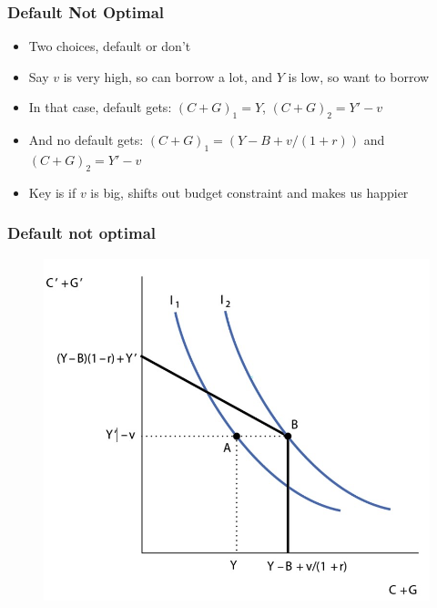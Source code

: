 \documentclass{beamer}
\begin{document}
\begin{frame}
\frametitle[alignment=center]{Default Not Optimal}
\begin{itemize}
\item Two choices, default or don't
\bigskip
\item Say $v$ is very high, so can borrow a lot, and $Y$ is low, so want to borrow
\bigskip
\item In that case, default gets: $(C+G)_1=Y$, $(C+G)_2=Y'-v$
\bigskip
\item And no default gets: $(C+G)_1=(Y-B+v/(1+r))$ and $(C+G)_2=Y'-v$
\bigskip
\item Key is if $v$ is big, shifts out budget constraint and makes us happier
\end{itemize}
\end{frame}

\begin{frame}
\frametitle[alignment=center]{Default not optimal}
\begin{figure}
\centering
\includegraphics[scale=0.7]{Figures/W_Fig_16pt4.png}
\end{figure}
\end{frame}
\end{document}

